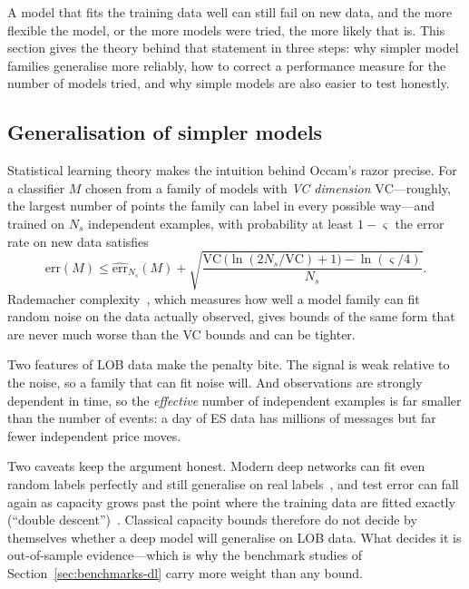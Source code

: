 A model that fits the training data well can still fail on new data, and the more flexible the
model, or the more models were tried, the more likely that is. This section gives the theory behind
that statement in three steps: why simpler model families generalise more reliably, how to correct a
performance measure for the number of models tried, and why simple models are also easier to test
honestly.

\subsection{Generalisation of simpler models}

Statistical learning theory makes the intuition behind Occam's razor precise. For a classifier $M$ chosen
from a family of models with \emph{VC dimension} $\mathrm{VC}$---roughly, the largest number of points
the family can label in every possible way---and trained on $N_s$ independent examples, with probability
at least $1-\varsigma$ the error rate on new data satisfies~\citep{vapnik1998}
\begin{equation}
  \text{err}(M) \le \widehat{\text{err}}_{N_s}(M) +
  \sqrt{\frac{\mathrm{VC}\,\big(\ln(2N_s/\mathrm{VC}) + 1\big) - \ln(\varsigma/4)}{N_s}} .
\end{equation}
 Rademacher complexity~\citep{bartlett2002}, which measures how well a model family can fit
random noise on the data actually observed, gives bounds of the same form that are never much worse than the VC bounds and can be tighter.

Two features of LOB data make the penalty bite. The signal is weak relative to the noise, so a family
that can fit noise will. And observations are strongly dependent in time, so the \emph{effective}
number of independent examples is far smaller than the number of events: a day of ES data has
millions of messages but far fewer independent price moves.

Two caveats keep the argument honest. Modern deep networks can fit even random labels perfectly and
still generalise on real labels~\citep{zhang2017rethinking}, and test error can fall again as capacity
grows past the point where the training data are fitted exactly (``double
descent'')~\citep{belkin2019}. Classical capacity bounds therefore do not decide by themselves whether
a deep model will generalise on LOB data. What decides it is out-of-sample evidence---which is why the
benchmark studies of Section~\ref{sec:benchmarks-dl} carry more weight than any bound.


